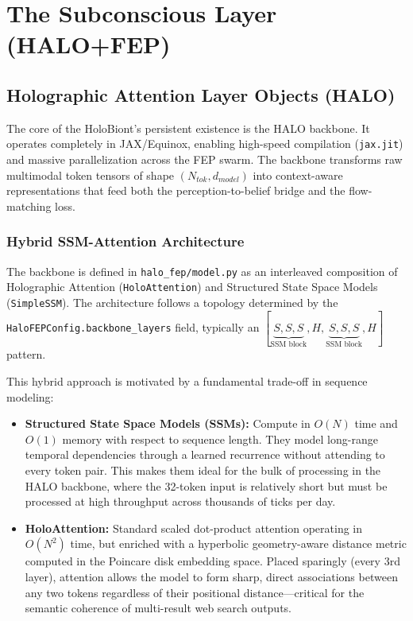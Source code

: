 \chapter{The Subconscious Layer (HALO+FEP)}

\section{Holographic Attention Layer Objects (HALO)}

The core of the HoloBiont's persistent existence is the HALO backbone. It operates completely in JAX/Equinox, enabling high-speed compilation (\texttt{jax.jit}) and massive parallelization across the FEP swarm. The backbone transforms raw multimodal token tensors of shape $(N_{tok}, d_{model})$ into context-aware representations that feed both the perception-to-belief bridge and the flow-matching loss.

\subsection{Hybrid SSM-Attention Architecture}

The backbone is defined in \texttt{halo\_fep/model.py} as an interleaved composition of Holographic Attention (\texttt{HoloAttention}) and Structured State Space Models (\texttt{SimpleSSM}). The architecture follows a topology determined by the \texttt{HaloFEPConfig.backbone\_layers} field, typically an $[\underbrace{S, S, S}_{\text{SSM block}}, H, \underbrace{S, S, S}_{\text{SSM block}}, H]$ pattern.

This hybrid approach is motivated by a fundamental trade-off in sequence modeling:

\begin{itemize}
    \item \textbf{Structured State Space Models (SSMs):} Compute in $O(N)$ time and $O(1)$ memory with respect to sequence length. They model long-range temporal dependencies through a learned recurrence without attending to every token pair. This makes them ideal for the bulk of processing in the HALO backbone, where the 32-token input is relatively short but must be processed at high throughput across thousands of ticks per day.

    \item \textbf{HoloAttention:} Standard scaled dot-product attention operating in $O(N^2)$ time, but enriched with a hyperbolic geometry-aware distance metric computed in the Poincare disk embedding space. Placed sparingly (every 3rd layer), attention allows the model to form sharp, direct associations between any two tokens regardless of their positional distance---critical for the semantic coherence of multi-result web search outputs.
\end{itemize}


